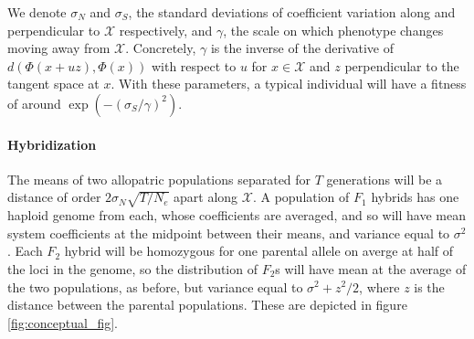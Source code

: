 \documentclass{article}
\newcommand{\1}{\mathbbm{1}}
\newcommand{\optx}{\mathcal{X}}
\newcommand{\dph}{d}
\begin{document}
We denote
$\sigma_N$ and $\sigma_S$, the standard deviations of coefficient variation along and perpendicular to $\optx$ respectively,
and $\gamma$, the scale on which phenotype changes moving away from $\optx$.
Concretely, $\gamma$ is the inverse of the derivative of $\dph(\Phi(x+u z), \Phi(x))$ 
with respect to $u$ for $x \in \optx$ and $z$ perpendicular to the tangent space at $x$.
With these parameters, a typical individual will have a fitness of around $\exp(-(\sigma_S/\gamma)^2)$.

\paragraph{Hybridization}
The means of two allopatric populations separated for $T$ generations
will be a distance of order $2\sigma_N \sqrt{T/N_e}$ apart along $\optx$.
A population of $F_1$ hybrids has one haploid genome from each,
whose coefficients are averaged,
and so will have mean system coefficients at the midpoint between their means,
and variance equal to $\sigma^2$. 
Each $F_2$ hybrid will be homozygous for one parental allele on averge at half of the loci in the genome,
so the distribution of $F_2$s will have mean at the average of the two populations,
as before,
but variance equal to $\sigma^2 + z^2/2$, where $z$ is the distance between the parental populations. 
These are depicted in figure \ref{fig:conceptual_fig}.
\end{document}
